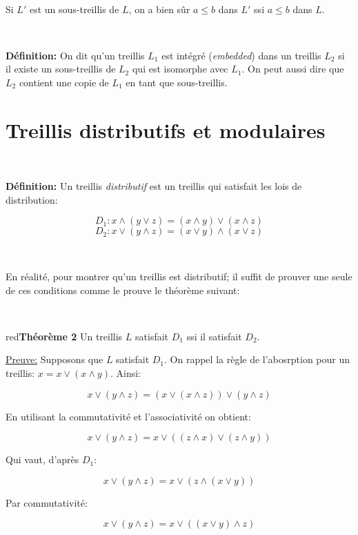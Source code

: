 \documentclass[a4paper, 11pt]{article}
\begin{document}
\

Si $L'$ est un sous-treillis de $L$, on a bien sûr $a \leq b$ dans $L'$ ssi $a \leq b$ dans $L$.

\

\begin{tcolorbox} 
	\textbf{Définition:} On dit qu'un treillis $L_1$ est intégré (\textit{embedded}) dans un treillis $L_2$ si il existe un sous-treillis de $L_2$ qui est isomorphe avec $L_1$. On peut aussi dire que $L_2$ contient une copie de $L_1$ en tant que sous-treillis. 
\end{tcolorbox}

\section{Treillis distributifs et modulaires}

\

\begin{tcolorbox} 
	\textbf{Définition:} Un treillis \textit{distributif} est un treillis qui satisfait les lois de distribution:

	$$D_1: x \land (y \lor z) = (x \land y) \lor (x \land z)$$
	$$ D_2: x \lor (y \land z) = (x \lor y) \land (x \lor z)$$
\end{tcolorbox}

\

En réalité, pour montrer qu'un treillis est distributif; il suffit de prouver une seule de ces conditions comme le prouve le théorème suivant:

\

\begin{mybox}{red}{\textbf{Théorème 2}}
	Un treillis $L$ satisfait $D_1$ ssi il satisfait $D_2$.
\end{mybox}

\noindent
\underline{Preuve:} Supposons que $L$ satisfait $D_1$. On rappel la règle de l'abosrption pour un treillis: $x = x \lor (x \land y)$. Ainsi:

$$x \lor (y \land z) = (x \lor (x \land z)) \lor (y \land z)$$

En utilisant la commutativité et l'associativité on obtient:

$$x \lor (y \land z) = x \lor ((z \land x) \lor (z \land y))$$

Qui vaut, d'après $D_1$:

$$ x \lor (y \land z) = x \lor (z \land (x \lor y))$$

Par commutativité:

$$ x \lor (y \land z) = x \lor ((x \lor y) \land z)$$
\end{document}
